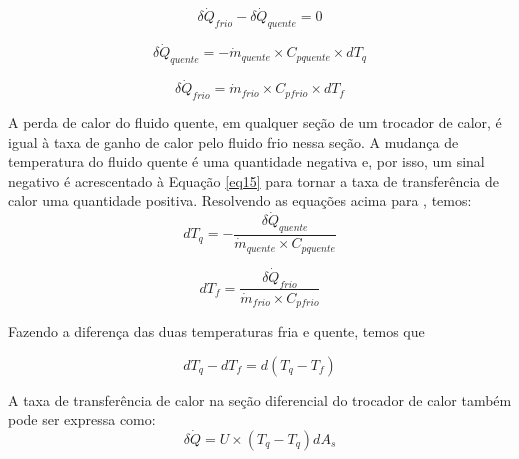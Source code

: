 \documentclass[a4paper,12pt,oneside]{article}
\begin{document}
\begin{flushright}
\begin{equation}\label{eq14}
 \delta \dot{Q}_{frio} - \delta \dot{Q}_{quente}  = 0
\end{equation}
\vspace{0.5cm}

\begin{equation}\label{eq15}
\delta \dot{Q}_{quente} = -\dot{m}_{quente} \times C_{pquente} \times dT_{q}
\end{equation}
\vspace{0.5cm}

\begin{equation}\label{eq16}
	\delta \dot{Q}_{frio} = \dot{m}_{frio} \times C_{pfrio} \times dT_{f}
\end{equation}
\vspace{0.5cm}

A perda de calor do fluido quente, em qualquer seção de um trocador de calor, é igual à taxa de ganho de calor pelo fluido frio nessa seção. A mudança de temperatura do fluido quente é uma quantidade negativa e, por isso, um sinal negativo é acrescentado à Equação \ref{eq15} para tornar a taxa de transferência de calor uma quantidade positiva. Resolvendo as equações acima para , temos:\\

\begin{equation}\label{eq17}
dT_{q} = -  \frac{\delta \dot{Q}_{quente}}{\dot{m}_{quente} \times C_{pquente}}
\end{equation}
\vspace{0.5cm}

\begin{equation}\label{eq18}
dT_{f} = \frac{\delta \dot{Q}_{frio}}{\dot{m}_{frio} \times C_{pfrio}}
\end{equation}
\vspace{0.5cm}

Fazendo a diferença das duas temperaturas fria e quente, temos que 

\begin{equation}\label{eq19}
dT_{q} - dT_{f} = d(T_{q} - T_{f})
\end{equation}
\vspace{0.5cm}

A taxa de transferência de calor na seção diferencial do trocador de calor também pode ser expressa como:\\

\begin{equation}\label{eq20}
	\delta \dot{Q} = U \times (T_{q} - T_{q})dA_{s}
\end{equation}
\vspace{0.5cm}


\end{flushright}
\end{document}
